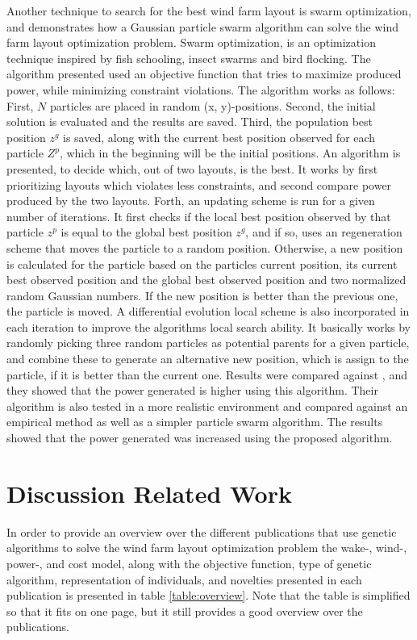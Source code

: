 \noindent Another technique to search for the best wind farm layout is swarm optimization, and \cite{Wan2012} demonstrates how a Gaussian particle swarm algorithm can solve the wind farm layout optimization problem. Swarm optimization, is an optimization technique inspired by fish schooling, insect swarms and bird flocking. The algorithm presented used an objective function that tries to maximize produced power, while minimizing constraint violations. The algorithm works as follows: First, $N$ particles are placed in random (x, y)-positions. Second, the initial solution is evaluated and the results are saved. Third, the population best position $z^g$ is saved, along with the current best position observed for each particle $Z^p$, which in the beginning will be the initial positions. An algorithm is presented, to decide which, out of two layouts, is the best. It works by first prioritizing layouts which violates less constraints, and second compare power produced by the two layouts. Forth, an updating scheme is run for a given number of iterations. It first checks if the local best position observed by that particle $z^p$ is equal to the global best position $z^g$, and if so, uses an regeneration scheme that moves the particle to a random position. Otherwise, a new position is calculated for the particle based on the particles current position, its current best observed position and the global best observed position and two normalized random Gaussian numbers. If the new position is better than the previous one, the particle is moved. A differential evolution local scheme is also incorporated in each iteration to improve the algorithms local search ability. It basically works by randomly picking three random particles as potential parents for a given particle, and combine these to generate an alternative new position, which is assign to the particle, if it is better than the current one. Results were compared against \citep{Grady}, and they showed that the power generated is higher using this algorithm. Their algorithm is also tested in a more realistic environment and compared against an empirical method as well as a simpler particle swarm algorithm. The results showed that the power generated was increased using the proposed algorithm.\\


\section{Discussion Related Work}\label{section:relatedworkdiscussion}
In order to provide an overview over the different publications that use genetic algorithms to solve the wind farm layout optimization problem the wake-, wind-, power-, and cost model, along with the objective function, type of genetic algorithm, representation of individuals, and novelties presented in each publication is presented in table \ref{table:overview}. Note that the table is simplified so that it fits on one page, but it still provides a good overview over the publications. \\

